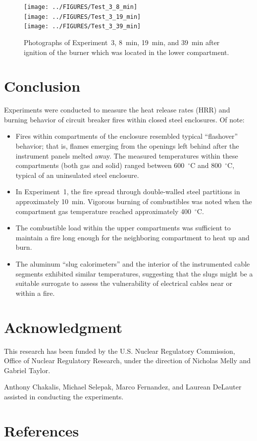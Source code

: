 \documentclass[12pt]{article}
\begin{document}
\begin{figure}[p]
\centering
\texttt{[image: ../FIGURES/Test\_3\_8\_min]} \\
\texttt{[image: ../FIGURES/Test\_3\_19\_min]} \\
\texttt{[image: ../FIGURES/Test\_3\_39\_min]}
\caption[Photographs of Experiment~3]{Photographs of Experiment~3, 8~min, 19~min, and 39~min after ignition of the burner which was located in the lower compartment.}
\label{fig:Test_3_photos}
\end{figure}



\clearpage

\section{Conclusion}

Experiments were conducted to measure the heat release rates (HRR) and burning behavior of circuit breaker fires within closed steel enclosures. Of note:
\begin{itemize}
\item Fires within compartments of the enclosure resembled typical  ``flashover'' behavior; that is, flames emerging from the openings left behind after the instrument panels melted away. The measured temperatures within these compartments (both gas and solid) ranged between 600~$^\circ$C and 800~$^\circ$C, typical of an uninsulated steel enclosure.
\item In Experiment~1, the fire spread through double-walled steel partitions in approximately 10~min. Vigorous burning of combustibles was noted when the compartment gas temperature reached approximately 400~$^\circ$C.
\item The combustible load within the upper compartments was sufficient to maintain a fire long enough for the neighboring compartment to heat up and burn.
\item The aluminum ``slug calorimeters'' and the interior of the instrumented cable segments exhibited similar temperatures, suggesting that the slugs might be a suitable surrogate to assess the vulnerability of electrical cables near or within a fire.
\end{itemize}



\section{Acknowledgment}

This research has been funded by the U.S. Nuclear Regulatory Commission, Office of Nuclear Regulatory Research, under the direction of Nicholas Melly and Gabriel Taylor.

Anthony Chakalis, Michael Selepak, Marco Fernandez, and Laurean DeLauter assisted in conducting the experiments.



\clearpage


\section*{References}


\end{document}
